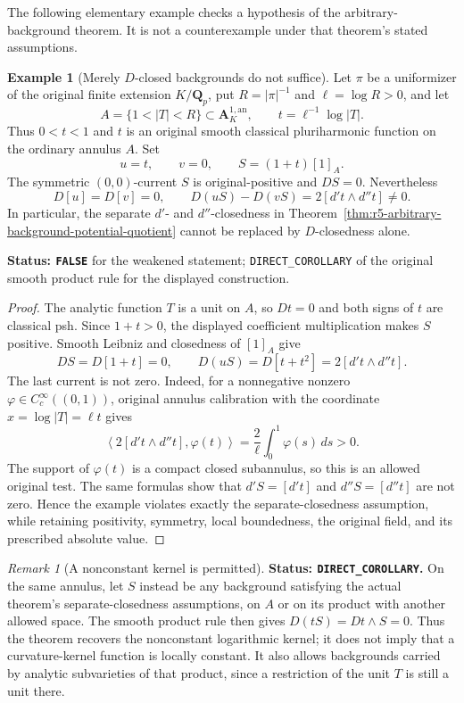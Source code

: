 \documentclass[11pt,a4paper]{article}
\numberwithin{equation}{section}
\theoremstyle{definition}
\newtheorem{example}[theorem]{Example}
\theoremstyle{remark}
\newtheorem{remark}[theorem]{Remark}
\begin{document}
The following elementary example checks a hypothesis of the
arbitrary-background theorem.  It is not a counterexample under
that theorem's stated assumptions.

\begin{example}[Merely $D$-closed backgrounds do not suffice]
\label{ex:r5-D-closed-background-failure}
Let $\pi$ be a uniformizer of the original finite extension
$K/\mathbf Q_p$, put $R=|\pi|^{-1}$ and $\ell=\log R>0$, and
let
\[
 A=\{1<|T|<R\}\subset\mathbf A_K^{1,\mathrm{an}},
 \qquad t=\ell^{-1}\log|T|.
\]
Thus $0<t<1$ and $t$ is an original smooth classical
pluriharmonic function on the ordinary annulus $A$.
Set
\[
 u=t,\qquad v=0,\qquad S=(1+t)[1]_A.
\]
The symmetric $(0,0)$-current $S$ is original-positive and
$DS=0$.  Nevertheless
\begin{equation}
 D[u]=D[v]=0,
 \qquad D(uS)-D(vS)=2[d't\wedge d''t]\ne0.
 \label{eq:r5-D-closed-background-failure}
\end{equation}
In particular, the separate $d'$- and $d''$-closedness in
Theorem~\ref{thm:r5-arbitrary-background-potential-quotient}
cannot be replaced by $D$-closedness alone.
\end{example}

\noindent\textbf{Status: \texttt{FALSE}} for the weakened
statement; \texttt{DIRECT\_COROLLARY} of the original smooth
product rule for the displayed construction.

\begin{proof}
The analytic function $T$ is a unit on $A$, so $Dt=0$ and
both signs of $t$ are classical psh.  Since $1+t>0$, the
displayed coefficient multiplication makes $S$ positive.
Smooth Leibniz and closedness of $[1]_A$ give
\[
 DS=D[1+t]=0,
 \qquad D(uS)=D[t+t^2]=2[d't\wedge d''t].
\]
The last current is not zero.  Indeed, for a nonnegative
nonzero $\varphi\in C_c^\infty((0,1))$, original annulus
calibration with the coordinate $x=\log|T|=\ell t$ gives
\[
 \left\langle 2[d't\wedge d''t],\varphi(t)\right\rangle
       =\frac{2}{\ell}\int_0^1\varphi(s)\,ds>0.
\]
The support of $\varphi(t)$ is a compact closed subannulus,
so this is an allowed original test.  The same formulas show
that $d'S=[d't]$ and $d''S=[d''t]$ are not zero.  Hence the
example violates exactly the separate-closedness assumption,
while retaining positivity, symmetry, local boundedness,
the original field, and its prescribed absolute value.
\end{proof}

\begin{remark}[A nonconstant kernel is permitted]
\label{rem:r5-nonconstant-annulus-kernel}
\textbf{Status: \texttt{DIRECT\_COROLLARY}.}
On the same annulus, let $S$ instead be any background satisfying
the actual theorem's separate-closedness assumptions, on $A$ or
on its product with another allowed space.  The smooth product
rule then gives $D(tS)=Dt\wedge S=0$.  Thus the theorem recovers
the nonconstant logarithmic kernel; it does not imply that a
curvature-kernel function is locally constant.  It also allows
backgrounds carried by analytic subvarieties of that product,
since a restriction of the unit $T$ is still a unit there.
\end{remark}
\end{document}
